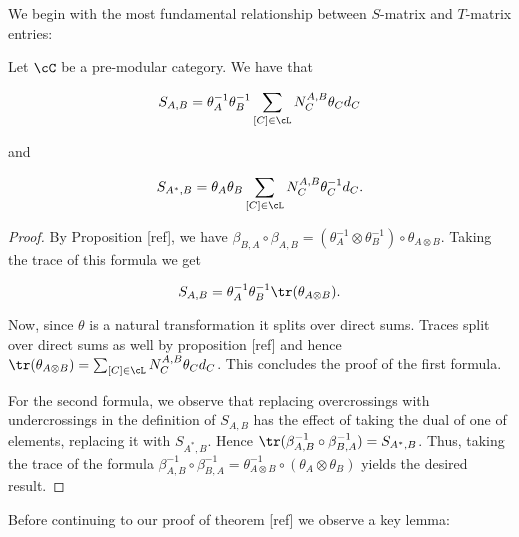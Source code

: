 We begin with the most fundamental relationship between $S$-matrix and $T$-matrix entries:


\begin{lem} Let $\cC$ be a pre-modular category. We have that

$$S_{A,B}=\theta_A^{-1}\theta_{B}^{-1}\sum_{[C]\in \cL}N^{A,B}_{C}\theta_{C}d_C$$

and

$$S_{A^*,B}=\theta_A\theta_{B}\sum_{[C]\in \cL}N^{A,B}_{C}\theta^{-1}_{C}d_C.$$
\end{lem}
\begin{proof} By Proposition [ref], we have $\beta_{B,A}\circ \beta_{A,B}=(\theta_{A}^{-1}\otimes \theta_{B}^{-1}) \circ \theta_{A\otimes B }$. Taking the trace of this formula we get

$$S_{A,B}=\theta_{A}^{-1}\theta_{B}^{-1}\tr(\theta_{A\otimes B}).$$

Now, since $\theta$ is a natural transformation it splits over direct sums. Traces split over direct sums as well by proposition [ref] and hence $\tr(\theta_{A\otimes B})=\sum_{[C]\in \cL}N^{A,B}_{C}\theta_{C}d_C$. This concludes the proof of the first formula.

For the second formula, we observe that replacing overcrossings with undercrossings in the definition of $S_{A,B}$ has the effect of taking the dual of one of elements, replacing it with $S_{A^*,B}$. Hence $\tr(\beta_{A,B}^{-1}\circ \beta_{B,A}^{-1})=S_{A^*,B}$. Thus, taking the trace of the formula $\beta_{A,B}^{-1}\circ \beta_{B,A}^{-1}=\theta^{-1}_{A\otimes B }\circ (\theta_{A}\otimes \theta_{B})$ yields the desired result.
\end{proof}

Before continuing to our proof of theorem [ref] we observe a key lemma:

